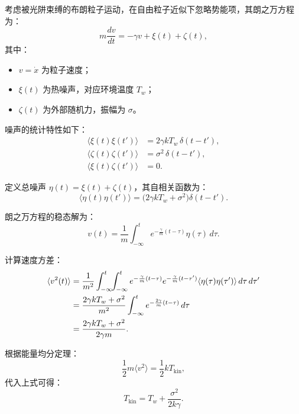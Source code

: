 \documentclass[a4paper]{report}
\begin{document}
考虑被光阱束缚的布朗粒子运动，在自由粒子近似下忽略势能项，其朗之万方程为：
\begin{equation}
m \frac{dv}{dt} = -\gamma v + \xi(t) + \zeta(t),
\end{equation}
其中：
\begin{itemize}
    \item $v = \dot{x}$ 为粒子速度；
    \item $\xi(t)$ 为热噪声，对应环境温度 $T_w$；
    \item $\zeta(t)$ 为外部随机力，振幅为 $\sigma$。
\end{itemize}

噪声的统计特性如下：
\begin{align}
\langle \xi(t) \xi(t') \rangle &= 2\gamma k T_w \,\delta(t - t'), \\
\langle \zeta(t) \zeta(t') \rangle &= \sigma^2 \,\delta(t - t'), \\
\langle \xi(t) \zeta(t') \rangle &= 0.
\end{align}

定义总噪声 $\eta(t) = \xi(t) + \zeta(t)$，其自相关函数为：
\begin{equation}
\langle \eta(t) \eta(t') \rangle = \big( 2\gamma k T_w + \sigma^2 \big) \delta(t - t').
\end{equation}

朗之万方程的稳态解为：
\begin{equation}
v(t) = \frac{1}{m} \int_{-\infty}^{t} e^{-\frac{\gamma}{m}(t-\tau)} \eta(\tau) \, d\tau.
\end{equation}

计算速度方差：
\begin{align}
\langle v^2(t) \rangle &= \frac{1}{m^2} \int_{-\infty}^{t} \!\! \int_{-\infty}^{t} 
e^{-\frac{\gamma}{m}(t-\tau)} e^{-\frac{\gamma}{m}(t-\tau')} 
\langle \eta(\tau) \eta(\tau') \rangle \, d\tau \, d\tau' \notag \\
&= \frac{2\gamma k T_w + \sigma^2}{m^2} \int_{-\infty}^{t} e^{-\frac{2\gamma}{m}(t-\tau)} \, d\tau \notag \\
&= \frac{2\gamma k T_w + \sigma^2}{2\gamma m}.
\end{align}

根据能量均分定理：
\begin{equation}
\frac{1}{2} m \langle v^2 \rangle = \frac{1}{2} k T_{\text{kin}},
\end{equation}
代入上式可得：
\begin{equation}
T_{\text{kin}} = T_w + \frac{\sigma^2}{2k\gamma}.
\end{equation}
\end{document}
